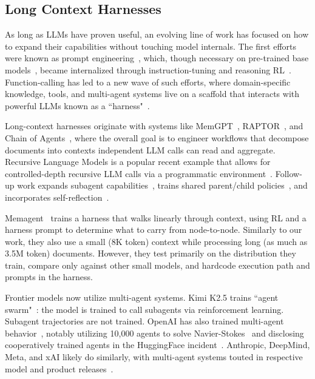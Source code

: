 \subsection{Long Context Harnesses}

As long as LLMs have proven useful, an evolving line of work has focused on how to expand their capabilities without touching model internals. The first efforts were known as prompt engineering~\citep{phoenix2024promptengineering,berryman2024promptengineering}, which, though necessary on pre-trained base models~\citep{brown2020gpt3}, became internalized through instruction-tuning and reasoning RL~\citep{ouyang2022instructgpt,guo2025deepseekr1}. Function-calling has led to a new wave of such efforts, where domain-specific knowledge, tools, and multi-agent systems live on a scaffold that interacts with powerful LLMs known as a ``harness"~\citep{lopopolo2026harnessengineering,barbaste2026harnessengineering}. 

Long-context harnesses originate with systems like MemGPT~\citep{packer2023memgpt}, RAPTOR~\citep{sarthi2024raptor}, and Chain of Agents~\citep{zhang2024coa}, where the overall goal is to engineer workflows that decompose documents into contexts independent LLM calls can read and aggregate. Recursive Language Models is a popular recent example that allows for controlled-depth recursive LLM calls via a programmatic environment~\citep{zhang2025rlm}. Follow-up work expands subagent capabilities~\citep{lumer2026rah}, trains shared parent/child policies~\citep{kim2026reinforcingrlm}, and incorporates self-reflection~\citep{alizadeh2026srlm}.

Memagent~\citep{yu2025memagent} trains a harness that walks linearly through context, using RL and a harness prompt to determine what to carry from node-to-node. Similarly to our work, they also use a small (8K token) context while processing long (as much as 3.5M token) documents. However, they test primarily on the distribution they train, compare only against other small models, and hardcode execution path and prompts in the harness.

Frontier models now utilize multi-agent systems. Kimi K2.5 trains ``agent swarm"~\citep{kimiteam2026kimik25}: the model is trained to call subagents via reinforcement learning. Subagent trajectories are not trained. OpenAI has also trained multi-agent behavior~\citep{openai2026gpt56}, notably utilizing 10,000 agents to solve Navier-Stokes~\citep{openai2026navierstokes} and disclosing cooperatively trained agents in the HuggingFace incident~\citep{openai2026hfincident,greenblatt2026hfinvestigation}. Anthropic, DeepMind, Meta, and xAI likely do similarly, with multi-agent systems touted in respective model and product releases~\citep{anthropic2025multiagent,anthropic2026agentteams,openai2026codexsubagents,xai2026grokmultiagent,xai2025grok4,meta2026musespark,google2025deepthink,gottweis2026coscientist}.

